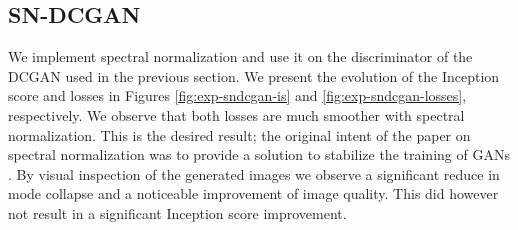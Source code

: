 \subsection{SN-DCGAN}
\label{sec:exp-sndcgan}
We implement spectral normalization and use it on the discriminator of the DCGAN used in the previous section. We present the evolution of the Inception score and losses in Figures \ref{fig:exp-sndcgan-is} and \ref{fig:exp-sndcgan-losses}, respectively. We observe that both losses are much smoother with spectral normalization. This is the desired result; the original intent of the paper on spectral normalization was to provide a solution to stabilize the training of GANs \cite{miyato2018spectral}. By visual inspection of the generated images we observe a significant reduce in mode collapse and a noticeable improvement of image quality. This did however not result in a significant Inception score improvement.
   

